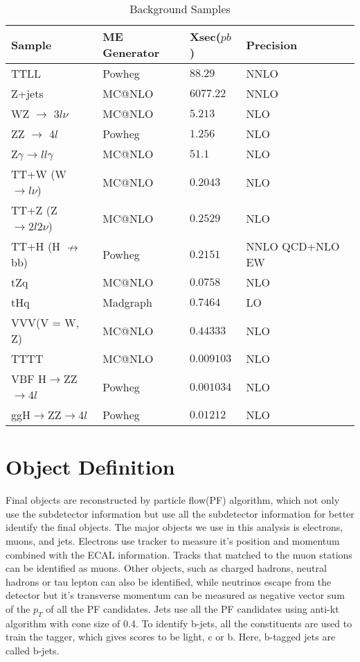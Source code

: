 \documentclass[
12pt, %
a4paper, %
oneside, %
headinclude,footinclude, %
BCOR5mm, %
]{scrartcl}
\begin{document}
\begin{table}[hbt]
    \caption{Background Samples}
    \centering
    \begin{tabular}{llll}
        \toprule
        Sample  & ME Generator    & Xsec($pb$)    & Precision \\
        \midrule
        TTLL & Powheg & $88.29$ & NNLO \\
        Z+jets & MC@NLO & $6077.22$ & NNLO \\
        WZ $\rightarrow$ 3$l\nu$ & MC@NLO & $5.213$ & NLO \\
        ZZ $\rightarrow$ 4$l$ & Powheg & $1.256$ & NLO \\
        Z$\gamma \rightarrow ll\gamma$ & MC@NLO & $51.1$ & NLO \\
        TT+W (W $\rightarrow l\nu$) & MC@NLO & $0.2043$ & NLO \\
        TT+Z (Z $\rightarrow 2l2\nu$) & MC@NLO & $0.2529$ & NLO \\
        TT+H (H $\nrightarrow$ bb) & Powheg & $0.2151$ & NNLO QCD+NLO EW \\
        tZq & MC@NLO & $0.0758$ & NLO \\
        tHq & Madgraph & $0.7464$ & LO \\
        VVV(V = W, Z) & MC@NLO & $0.44333$ & NLO \\
        TTTT & MC@NLO & $0.009103$ & NLO \\
        VBF H$\rightarrow$ZZ$\rightarrow$4$l$ & Powheg & $0.001034$ & NLO \\
        ggH$\rightarrow$ZZ$\rightarrow$4$l$ & Powheg & $0.01212$ & NLO \\
        \bottomrule
    \end{tabular}
    \label{tab:label}
\end{table}

\section{Object Definition}
Final objects are reconstructed by particle flow(PF) algorithm\cite{ParticleFlow}, which not only use the subdetector
information but use all the subdetector information for better identify the final objects.
The major objects we use in this analysis is electrons, muons, and jets. Electrons use tracker to measure
it's position and momentum combined with the ECAL information\cite{Electron}. Tracks that matched to the muon stations
can be identified as muons\cite{Muon}. Other objects, such as charged hadrons, neutral hadrons or tau lepton can also be identified,
while neutrinos escape from the detector but it's transverse momentum can be measured as negative vector sum of the $p_{T}$ of all the
PF candidates. Jets use all the PF candidates using anti-kt algorithm\cite{AntiKT} with cone size of 0.4.
To identify b-jets, all the constituents are used to train the tagger\cite{DeepJet}, which gives scores to be light, c or b.
Here, b-tagged jets are called b-jets.
\end{document}
